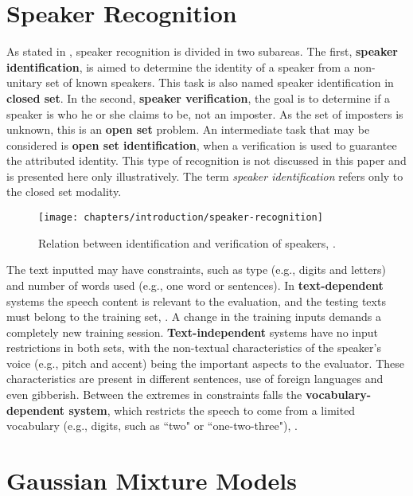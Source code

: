 \section{Speaker Recognition}
\label{sec:speaker-recognition}

As stated in , speaker recognition is divided in two subareas. The first, \textbf{speaker identification}, is aimed to determine the identity of a speaker from a non-unitary set of known speakers. This task is also named speaker identification in \textbf{closed set}. In the second, \textbf{speaker verification}, the goal is to determine if a speaker is who he or she claims to be, not an imposter. As the set of imposters is unknown, this is an \textbf{open set} problem. An intermediate task that may be considered is \textbf{open set identification}, when a verification is used to guarantee the attributed identity. This type of recognition is not discussed in this paper and is presented here only illustratively. The term \emph{speaker identification} refers only to the closed set modality.

\begin{figure}[ht]
    \centering
    \texttt{[image: chapters/introduction/speaker-recognition]}
    \caption{Relation between identification and verification of speakers, .}
    \label{fig:speaker-recognition}
\end{figure}

The text inputted may have constraints, such as type (e.g., digits and letters) and number of words used (e.g., one word or sentences). In \textbf{text-dependent} systems the speech content is relevant to the evaluation, and the testing texts must belong to the training set, . A change in the training inputs demands a completely new training session. \textbf{Text-independent} systems have no input restrictions in both sets, with the non-textual characteristics of the speaker's voice (e.g., pitch and accent) being the important aspects to the evaluator. These characteristics are present in different sentences, use of foreign languages and even gibberish. Between the extremes in constraints falls the \textbf{vocabulary-dependent system}, which restricts the speech to come from a limited vocabulary (e.g., digits, such as ``two" or ``one-two-three"), .

\section{Gaussian Mixture Models}
\label{sec:gmm}

